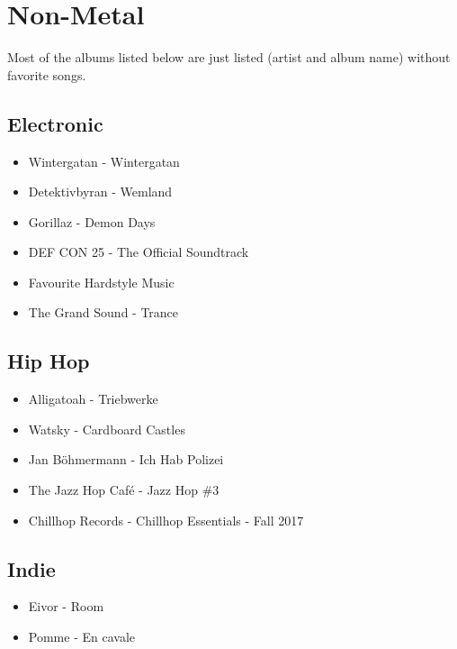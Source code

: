 
\cleardoublepage

\chapter{Non-Metal}\label{modern}

Most of the albums listed below are just listed (artist and album name) without favorite songs.

\section{Electronic}

\begin{itemize}
	\item Wintergatan - Wintergatan
	\item Detektivbyran - Wemland
	\item Gorillaz - Demon Days
	\item DEF CON 25 - The Official Soundtrack
	\item Favourite Hardstyle Music
	\item The Grand Sound - Trance
\end{itemize}

\section{Hip Hop}

\begin{itemize}
	\item Alligatoah - Triebwerke
	\item Watsky - Cardboard Castles
	\item Jan Böhmermann - Ich Hab Polizei
	\item The Jazz Hop Café - Jazz Hop \#3
	\item Chillhop Records - Chillhop Essentials - Fall 2017
\end{itemize}

\section{Indie}

\begin{itemize}
	\item Eivor - Room
	\item Pomme - En cavale 
\end{itemize}

